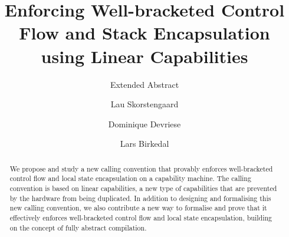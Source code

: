 \documentclass[sigplan, review]{acmart}
\begin{document}
\title{Enforcing Well-bracketed Control Flow and Stack Encapsulation using Linear Capabilities}
\subtitle{Extended Abstract}

\author{Lau Skorstengaard}

\author{Dominique Devriese}

\author{Lars Birkedal}



\begin{abstract}
We propose and study a new calling convention that provably enforces well-bracketed control flow and local state encapsulation on a capability machine.
The calling convention is based on linear capabilities, a new type of capabilities that are prevented by the hardware from being duplicated.
In addition to designing and formalising this new calling convention, we also contribute a new way to formalise and prove that it effectively enforces well-bracketed control flow and local state encapsulation, building on the concept of fully abstract compilation.
\end{abstract}

%
%
\end{document}
